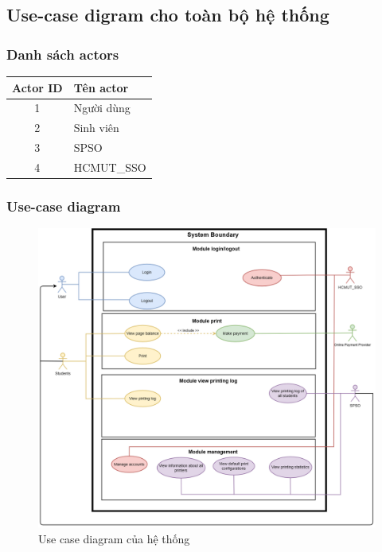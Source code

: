 \documentclass[a4paper]{article}
\begin{document}
\subsection{Use-case digram cho toàn bộ hệ thống}
\setlength{\arrayrulewidth}{0.3mm}
\subsubsection{Danh sách actors}
\begin{table}[h]
\centering
\begin{tabular}{|c|l|}
\hline
\rowcolor[HTML]{AAACED}
 Actor ID & Tên actor  \\ \hline
 1 & Người dùng  \\ \hline
 2 & Sinh viên  \\ \hline
 3 & SPSO  \\ \hline
 4 & HCMUT\_SSO  \\ \hline
\end{tabular}
\end{table}
\subsubsection{Use-case diagram}
\begin{figure}[H]
\begin{center}
    \includegraphics[width=14cm]{picture/Whole_system.drawio (2).png}
    \caption{Use case diagram của hệ thống}
\end{center}
\end{figure}
\end{document}
